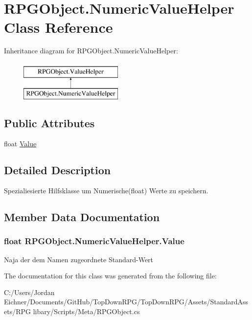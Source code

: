 \hypertarget{class_r_p_g_object_1_1_numeric_value_helper}{}\section{R\+P\+G\+Object.\+Numeric\+Value\+Helper Class Reference}
\label{class_r_p_g_object_1_1_numeric_value_helper}
Inheritance diagram for R\+P\+G\+Object.\+Numeric\+Value\+Helper\+:\begin{figure}[H]
\begin{center}
\leavevmode
\includegraphics[height=2.000000cm]{class_r_p_g_object_1_1_numeric_value_helper}
\end{center}
\end{figure}
\subsection*{Public Attributes}
\begin{DoxyCompactItemize}
\item 
float \hyperlink{class_r_p_g_object_1_1_numeric_value_helper_a848b98b34e4029244f2764a8b1724704}{Value}
\end{DoxyCompactItemize}


\subsection{Detailed Description}
Spezialiesierte Hilfsklasse um Numerische(float) Werte zu speichern. 

\subsection{Member Data Documentation}
\hypertarget{class_r_p_g_object_1_1_numeric_value_helper_a848b98b34e4029244f2764a8b1724704}{}
\subsubsection[{Value}]{\setlength{\rightskip}{0pt plus 5cm}float R\+P\+G\+Object.\+Numeric\+Value\+Helper.\+Value}\label{class_r_p_g_object_1_1_numeric_value_helper_a848b98b34e4029244f2764a8b1724704}
Naja der dem Namen zugeordnete Standard-\/\+Wert 

The documentation for this class was generated from the following file\+:\begin{DoxyCompactItemize}
\item 
C\+:/\+Users/\+Jordan Eichner/\+Documents/\+Git\+Hub/\+Top\+Down\+R\+P\+G/\+Top\+Down\+R\+P\+G/\+Assets/\+Standard\+Assets/\+R\+P\+G libary/\+Scripts/\+Meta/R\+P\+G\+Object.\+cs\end{DoxyCompactItemize}
